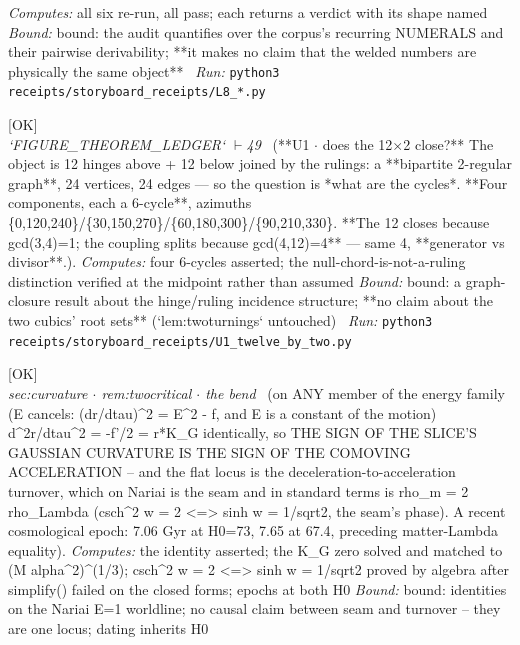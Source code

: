 \begin{description}
\emph{Computes:} all six re-run, all pass; each returns a verdict with its shape named
 \emph{Bound:} bound: the audit quantifies over the corpus's recurring NUMERALS and their pairwise derivability; **it makes no claim that the welded numbers are physically the same object**
\ \emph{Run:} \texttt{python3 receipts/storyboard\_receipts/L8\_*.py}
\item[\label{rcpt:U1_twelve_by_two}\texttt{U1\_twelve\_by\_two}]\hfill\textsf{[OK]}\\
\textit{`FIGURE\_THEOREM\_LEDGER` \ensuremath{\vdash}49} \ (**U1 \ensuremath{\cdot} does the 12\ensuremath{\times}2 close?** The object is 12 hinges above + 12 below joined by the rulings: a **bipartite 2-regular graph**, 24 vertices, 24 edges --- so the question is *what are the cycles*. **Four components, each a 6-cycle**, azimuths \{0,120,240\}/\{30,150,270\}/\{60,180,300\}/\{90,210,330\}. **The 12 closes because gcd(3,4)=1; the coupling splits because gcd(4,12)=4** --- same 4, **generator vs divisor**.). 
\emph{Computes:} four 6-cycles asserted; the null-chord-is-not-a-ruling distinction verified at the midpoint rather than assumed
 \emph{Bound:} bound: a graph-closure result about the hinge/ruling incidence structure; **no claim about the two cubics' root sets** (`lem:twoturnings` untouched)
\ \emph{Run:} \texttt{python3 receipts/storyboard\_receipts/U1\_twelve\_by\_two.py}
\item[\label{rcpt:P03_acceleration_is_slice_curvature}\texttt{P03\_acceleration\_is\_slice\_curvature}]\hfill\textsf{[OK]}\\
\textit{sec:curvature \ensuremath{\cdot} rem:twocritical \ensuremath{\cdot} the bend} \ (on ANY member of the energy family (E cancels: (dr/dtau)\textasciicircum{}2 = E\textasciicircum{}2 - f, and E is a constant of the motion) d\textasciicircum{}2r/dtau\textasciicircum{}2 = -f'/2 = r*K\_G identically, so THE SIGN OF THE SLICE'S GAUSSIAN CURVATURE IS THE SIGN OF THE COMOVING ACCELERATION -- and the flat locus is the deceleration-to-acceleration turnover, which on Nariai is the seam and in standard terms is rho\_m = 2 rho\_Lambda (csch\textasciicircum{}2 w = 2 <=> sinh w = 1/sqrt2, the seam's phase). A recent cosmological epoch: 7.06 Gyr at H0=73, 7.65 at 67.4, preceding matter-Lambda equality). 
\emph{Computes:} the identity asserted; the K\_G zero solved and matched to (M alpha\textasciicircum{}2)\textasciicircum{}(1/3); csch\textasciicircum{}2 w = 2 <=> sinh w = 1/sqrt2 proved by algebra after simplify() failed on the closed forms; epochs at both H0
 \emph{Bound:} bound: identities on the Nariai E=1 worldline; no causal claim between seam and turnover -- they are one locus; dating inherits H0

\end{description}
